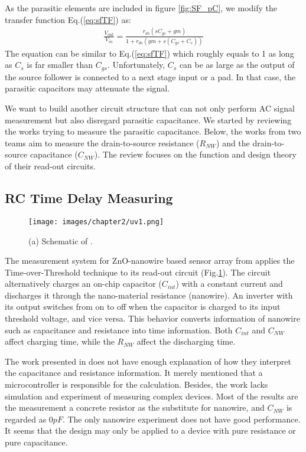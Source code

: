 As the parasitic elements are included in figure \ref{fig:SF_pC}, we modify the transfer function Eq.(\ref{eq:sfTF}) as:
\begin{align}
    \frac{V_{out}}{V_{in}} = \frac{r_{ds}(sC_{gs} + gm)}{1 + r_{ds}(gm + s(C_{gs}+C_s))}
\end{align}
The equation can be similar to Eq.(\ref{eq:sfTF}) which roughly equals to 1 as long as $C_s$ is far smaller than $C_{gs}$.
Unfortunately, $C_s$ can be as large as the output of the source follower is connected to a next stage input or a pad.
In that case, the parasitic capacitors may attenuate the signal.

We want to build another circuit structure that can not only perform AC signal measurement but also disregard parasitic capacitance.
We started by reviewing the works trying to measure the parasitic capacitance.
Below, the works from two teams aim to measure the drain-to-source resistance ($R_{NW}$) and the drain-to-source capacitance ($C_{NW}$).
The review focuses on the function and design theory of their read-out circuits.


\subsection{RC Time Delay Measuring}
\begin{figure}[!htbp]
    \centering
    \texttt{[image: images/chapter2/uv1.png]}
    \caption{(a) Schematic of \cite{Juv1}.}
    \label{fig:tot1}
\end{figure}

The measurement system for ZnO-nanowire based sensor array from \cite{Juv1} applies the Time-over-Threshold technique to its read-out circuit (Fig.\ref{fig:tot1}).
The circuit alternatively charges an on-chip capacitor ($C_{int}$) with a constant current and discharges it through the nano-material resistance (nanowire).
An inverter with its output switches from on to off when the capacitor is charged to its input threshold voltage, and vice versa.
This behavior converts information of nanowire such as capacitance and resistance into time information.
Both $C_{int}$ and $C_{NW}$ affect charging time, while the $R_{NW}$ affect the discharging time.

The work presented in \cite{Juv1} does not have enough explanation of how they interpret the capacitance and resistance information.
It merely mentioned that a microcontroller is responsible for the calculation.
Besides, the work lacks simulation and experiment of measuring complex devices.
Most of the results are the measurement a concrete resistor as the substitute for nanowire, and $C_{NW}$ is regarded as $0pF$.
The only nanowire experiment does not have good performance.
It seems that the design may only be applied to a device with pure resistance or pure capacitance.


